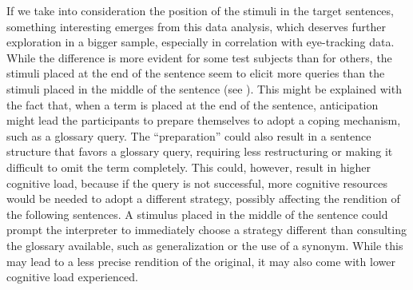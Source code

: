 \documentclass[output=paper]{langsci/langscibook}
\begin{document}
If we take into consideration the position of the stimuli in the target sentences, something interesting emerges from this data analysis, which deserves further exploration in a bigger sample, especially in correlation with eye-tracking data. While the difference is more evident for some test subjects than for others, the stimuli placed at the end of the sentence seem to elicit more queries than the stimuli placed in the middle of the sentence (see ). This might be explained with the fact that, when a term is placed at the end of the sentence, anticipation might lead the participants to prepare themselves to adopt a coping mechanism, such as a glossary query. The ``preparation'' could also result in a sentence structure that favors a glossary query, requiring less restructuring or making it difficult to omit the term completely. This could, however, result in higher cognitive load, because if the query is not successful, more cognitive resources would be needed to adopt a different strategy, possibly affecting the rendition of the following sentences. A stimulus placed in the middle of the sentence could prompt the interpreter to immediately choose a strategy different than consulting the glossary available, such as generalization or the use of a synonym. While this may lead to a less precise rendition of the original, it may also come with lower cognitive load experienced.
\end{document}
